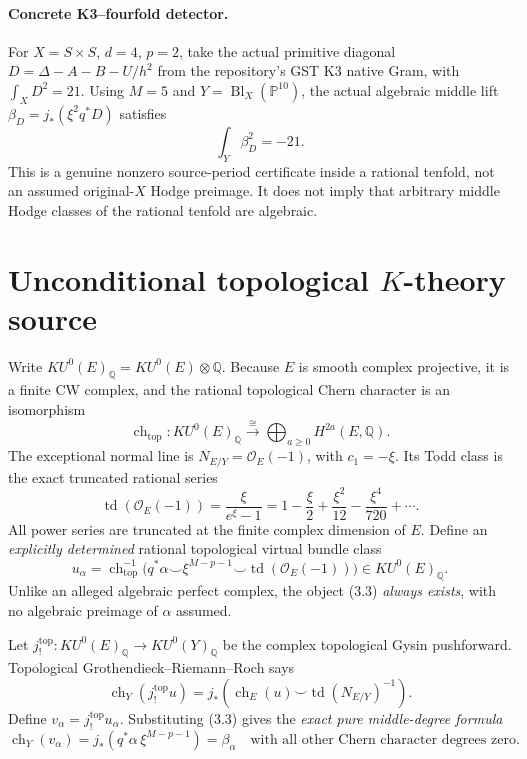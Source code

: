 \documentclass[11pt]{article}
\newcommand{\Q}{\mathbb Q}
\newcommand{\td}{\operatorname{td}}
\newcommand{\ch}{\operatorname{ch}}
\begin{document}
\paragraph{Concrete K3--fourfold detector.}
For \(X=S\times S\), \(d=4\), \(p=2\),
take the actual primitive diagonal
\(D=\Delta-A-B-U/h^2\) from the
repository's GST K3 native Gram,
with \(\int_XD^2=21\).
Using \(M=5\) and
\(Y=\operatorname{Bl}_X(\mathbb P^{10})\),
the actual algebraic middle lift
\(\beta_D=j_*(\xi^2q^*D)\) satisfies
\[
 \boxed{\int_Y\beta_D^2=-21.}
 \tag{3.3}
\]
This is a genuine nonzero source-period
certificate inside a rational tenfold,
not an assumed original-\(X\) Hodge
preimage. It does not imply that
arbitrary middle Hodge classes of the
rational tenfold are algebraic.

\section{Unconditional topological \(K\)-theory source}
Write \(KU^0(E)_{\Q}=KU^0(E)\otimes\Q\).
Because \(E\) is smooth complex projective,
it is a finite CW complex, and the rational
topological Chern character is an isomorphism
\[
 \ch_{\mathrm{top}}:KU^0(E)_{\Q}
  \xrightarrow{\ \cong\ }
  \bigoplus_{a\ge0}H^{2a}(E,\Q).
 \tag{3.1}
\]
The exceptional normal line is
\(N_{E/Y}=\mathcal O_E(-1)\), with
\(c_1=-\xi\). Its Todd class is the exact
truncated rational series
\[
 \td(\mathcal O_E(-1))
  =\frac{\xi}{e^\xi-1}
  =1-\frac{\xi}{2}+\frac{\xi^2}{12}
   -\frac{\xi^4}{720}+\cdots .
 \tag{3.2}
\]
All power series are truncated at the
finite complex dimension of \(E\).
Define an \emph{explicitly determined}
rational topological virtual bundle class
\[
 \boxed{
 u_\alpha=
 \ch_{\mathrm{top}}^{-1}
 \Big(q^*\alpha\smile\xi^{M-p-1}
     \smile\td(\mathcal O_E(-1))\Big)
 \in KU^0(E)_{\Q}.} \tag{3.3}
\]
Unlike an alleged algebraic perfect complex,
the object (3.3) \emph{always exists}, with
no algebraic preimage of \(\alpha\) assumed.

Let \(j_!^{\mathrm{top}}:KU^0(E)_{\Q}
\to KU^0(Y)_{\Q}\) be the complex topological
Gysin pushforward. Topological
Grothendieck--Riemann--Roch says
\[
 \ch_Y(j_!^{\mathrm{top}}u)
  =j_*\left(\ch_E(u)
     \smile\td(N_{E/Y})^{-1}\right).
 \tag{3.4}
\]
Define \(v_\alpha=j_!^{\mathrm{top}}u_\alpha\).
Substituting (3.3) gives the \emph{exact
pure middle-degree formula}
\[
 \boxed{\ch_Y(v_\alpha)=
 j_*(q^*\alpha\,\xi^{M-p-1})
 =\beta_\alpha\quad
 \text{with all other Chern character
 degrees zero}.} \tag{3.5}
\]
\end{document}
